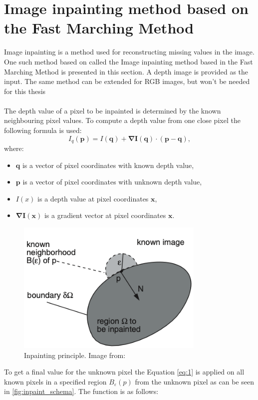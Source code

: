 \documentclass[twoside]{ctuthesis}
\theoremstyle{plain}
\theoremstyle{definition}
\theoremstyle{note}
\begin{document}
\section{Image inpainting method based on the Fast Marching Method} \label{inpainting}
Image inpainting is a method used for reconstructing missing values in the image. One such method based on \cite{cite:5} called the Image inpainting method based in the Fast Marching Method is presented in this section. A depth image is provided as the input. The same method can be extended for RGB images, but won't be needed for this thesis\\
\\
The depth value of a pixel to be inpainted is determined by the known neighbouring pixel values. To compute a depth value from one close pixel the following formula is used:
\begin{equation} \label{eq:1}
	I_q(\mathbf{p})=I(\mathbf{q})+\mathbf{\nabla I(q)}\cdot(\mathbf{p}-\mathbf{q}),
\end{equation}
where:
\begin{itemize}
	\item $\mathbf{q}$ is a vector of pixel coordinates with known depth value,
	\item $\mathbf{p}$ is a vector of pixel coordinates with unknown depth value,
	\item $I(x)$ is a depth value at pixel coordinates $\mathbf{x}$,
	\item $\mathbf{\nabla I(x)}$ is a gradient vector at pixel coordinates $\mathbf{x}$.
\end{itemize}
\begin{figure}[h]
	\centering
	\includegraphics[width=9cm]{inpaint_principle.png}
	\caption{Inpainting principle. Image from: \cite{cite:5}}
	\label{fig:inpaint_schema}
\end{figure}
To get a final value for the unknown pixel the Equation \eqref{eq:1} is applied on all known pixels in a specified region $B_{\varepsilon}(p)$ from the unknown pixel as can be seen in  \autoref{fig:inpaint_schema}. The function is as follows:
\end{document}

